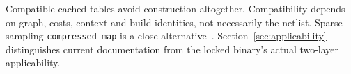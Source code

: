 Compatible cached tables avoid construction altogether. Compatibility depends on graph, costs, context and build identities, not necessarily the netlist. Sparse-sampling \texttt{compressed\_map} is a close alternative~\cite{vproptions}. Section~\ref{sec:applicability} distinguishes current documentation from the locked binary's actual two-layer applicability.
